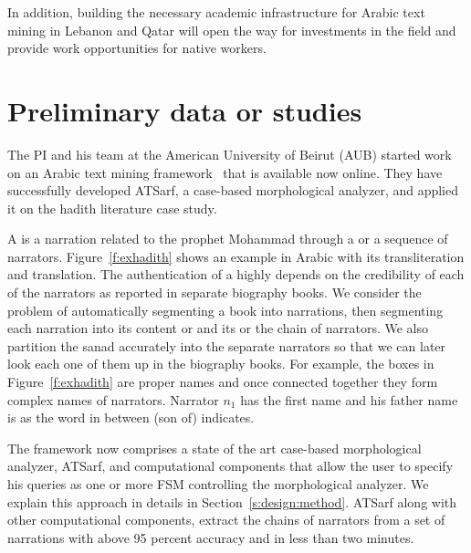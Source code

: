 \documentclass[12pt]{article}
\newcommand{\noArRL}[1]{\arabfalse\RL{#1}\arabtrue}
\newcommand{\noTrRL}[1]{\transfalse\RL{#1}\transtrue}
\begin{document}
In addition, building the necessary academic 
infrastructure for Arabic text mining in Lebanon and Qatar will 
open the way for investments in the field and provide work 
opportunities for native workers.

\pagebreak

\section{Preliminary data or studies}
\label{s:prelim}

The PI and his team at the American University of Beirut (AUB)
started work on an Arabic text mining framework~\cite{ATMine09}
that is available now online.
They have successfully developed ATSarf, a case-based morphological 
analyzer, and applied it on the hadith literature case study. 

A  is a narration related to the prophet Mohammad
through a  or a sequence of narrators. 
Figure~\ref{f:exhadith} shows an example \noArRL{.hady_t} in Arabic with its 
transliteration and translation. 
The authentication of a \noArRL{.hady_t} highly depends on the credibility
of each of the narrators as reported in separate biography 
books. 
We consider the problem of automatically segmenting
a \noArRL{.hady_t} book into narrations, then segmenting each 
narration into
its content or  and its \noArRL{sanad} or the
chain of narrators.
We also partition the sanad accurately into the 
separate narrators so that we can later look each one of them 
up in the biography books. 
For example, the boxes in Figure~\ref{f:exhadith} are proper names 
and once
connected together they form complex names of narrators. 
Narrator $n_1$ has the first name \noTrRL{qtybT} and his father 
name is \noTrRL{s`yd} as the word in between 
\noTrRL{bn} (son of) indicates. 

\transfalse
\begin{figure}[tb]
\end{figure}
\transtrue

The framework now comprises a state of the art
case-based morphological analyzer, ATSarf, 
and computational components that allow the user to
specify his queries as one or more FSM
controlling the morphological analyzer.
We explain this approach in details in 
Section~\ref{s:design:method}.
ATSarf along with other computational components, 
extract the chains of narrators from a set of narrations
with above 95 percent accuracy and in less than two minutes. 
\end{document}
